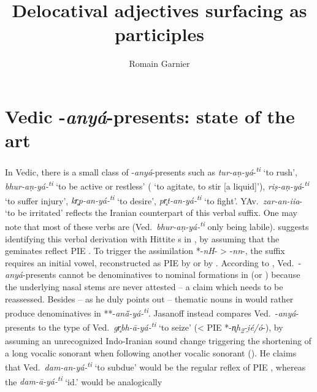 \documentclass[output=paper,colorlinks,citecolor=brown]{langscibook}
\author{Romain Garnier\orcid{}\affiliation{Université de Limoges}}
\title{Delocatival adjectives surfacing as participles}
\begin{document}
\maketitle


\section{Vedic -\textit{anyá}-presents: state of the art}
\label{sec:sota}

In Vedic, there is a small class of -\textit{anyá}-presents  such as \textit{tur-aṇ-yá}-\textit{\textsuperscript{ti}}  ‘to rush’, \textit{bhur-aṇ-yá-\textsuperscript{ti}}  ‘to be active or restless’ ( ‘to agitate, to stir [a liquid]’), \textit{riṣ-aṇ-yá}-\textit{\textsuperscript{ti}}  ‘to suffer injury’, \textit{kr̥p-an-yá-\textsuperscript{ti}}  `to desire’, \textit{pr̥t-an-yá-\textsuperscript{ti}}  ‘to fight’. YAv.\ \textit{zar-an-iia}-  ‘to be irritated’ reflects the Iranian counterpart of this verbal suffix. One may note that most of these verbs are  (Ved.\ \textit{bhur-aṇ-yá-\textsuperscript{ti}}  only being labile). \citet[122]{Jasanoff2003} suggests identifying this verbal derivation with Hittite s in , by assuming that the geminates reflect PIE . To trigger the assimilation *-\textit{nH}- > -\textit{nn}-, the suffix requires an initial vowel, reconstructed as PIE  by \citet[40--43]{Melchert1992} or  by \citet[175]{Kloekhorst2008}. According to \citet[125]{Jasanoff2003}, Ved.\ -\textit{anyá}-presents  cannot be denominatives to nominal formations in  (or ) because the underlying nasal stems are never attested – a claim which needs to be reassessed. Besides – as he duly points out – thematic nouns in  would rather produce denominatives in **-\textit{anā̆-yá-}\textit{\textsuperscript{ti}}. Jasanoff instead compares Ved.\ -\textit{anyá}-presents  to the type of Ved.\ \textit{gr̥bh-ā-yá-\textsuperscript{ti}}  ‘to seize’ (< PIE *-\textit{n̥h\textsubscript{2}-i̯é/ó}-), by assuming an unrecognized Indo-Iranian sound change triggering the shortening of a long vocalic sonorant when following another vocalic sonorant (\citealt[126]{Jasanoff2003}). He claims that Ved.\ \textit{dam-an-yá-\textsuperscript{ti}} ‘to subdue’ would be the regular reflex of PIE , whereas the  \textit{dam-ā-yá-\textsuperscript{ti}}  ‘id.’ would be analogically 
\end{document}
